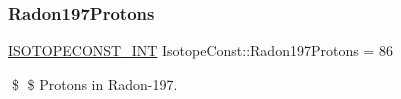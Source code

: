 \subsubsection{\texorpdfstring{Radon197\+Protons}{Radon197Protons}}
{\footnotesize\ttfamily \mbox{\hyperlink{group___isotope_const-_macros_ga5f18360b3e99483a35c32d789e62621c}{I\+S\+O\+T\+O\+P\+E\+C\+O\+N\+S\+T\+\_\+\+I\+NT}} Isotope\+Const\+::\+Radon197\+Protons = 86}

\$ \$ Protons in Radon-\/197. 